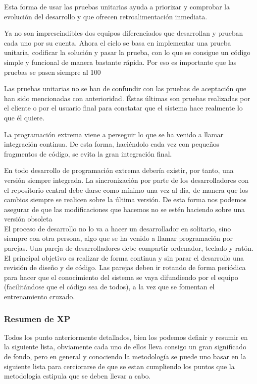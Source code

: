 \documentclass[12pt]{book} %
\begin{document}
			Esta forma de usar las pruebas unitarias ayuda a priorizar y comprobar la evolución del desarrollo y que ofrecen retroalimentación 
			inmediata.
			
			Ya no son imprescindibles dos equipos diferenciados que desarrollan y prueban cada uno por su cuenta. Ahora el ciclo se basa en 
			implementar una prueba unitaria, codificar la solución y pasar la prueba, con lo que se consigue un código simple y funcional de manera
			bastante rápida. Por eso es importante que las pruebas se pasen siempre al 100%
			 
			Las pruebas unitarias no se han de confundir con las pruebas de aceptación que han sido mencionadas con anterioridad. Éstas últimas son
			pruebas realizadas por el cliente o por el usuario final para constatar que el sistema hace realmente lo que él quiere.
			
			La programación extrema viene a perseguir lo que se ha venido a llamar integración continua. De esta forma, haciéndolo cada vez con 
			pequeños fragmentos de código, se evita la gran integración final. 
			
			En todo desarrollo de programación extrema debería existir, por tanto, una versión siempre integrada. La sincronización por parte de los
			desarrolladores con el repositorio central debe darse como mínimo una vez al día, de manera que los cambios siempre se realicen sobre 
			la última versión. De esta forma nos podemos asegurar de que las modificaciones que hacemos no se estén haciendo sobre una versión 
			obsoleta\\
			
			El proceso de desarrollo no lo va a hacer un desarrollador en solitario, sino siempre con otra persona, algo que se ha venido a llamar
			programación por parejas. Una pareja de desarrolladores debe compartir ordenador, teclado y ratón. El principal objetivo es realizar de 
			forma continua y sin parar el desarrollo una revisión de diseño y de código. Las parejas deben ir rotando de forma periódica para hacer 
			que el conocimiento del sistema se vaya difundiendo por el equipo (facilitándose que el código sea de todos), a la vez que se fomentan 
			el entrenamiento cruzado.
			
		\subsubsection{Resumen de XP}
			Todos los punto anteriormente detallados, bien los podemos definir y resumir en la siguiente lista, obviamente cada uno de ellos lleva consigo un gran significado de
			fondo, pero en general  y conociendo la metodología se puede uno basar en la siguiente lista para cerciorarse de que se estan cumpliendo los puntos que la metodología
			estipula que se deben llevar a cabo.
			
\end{document}
